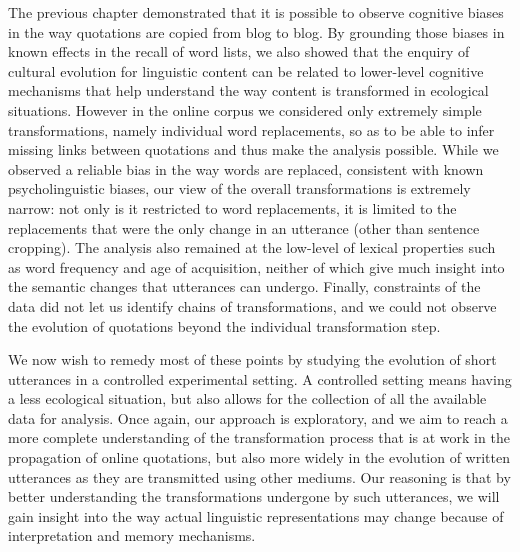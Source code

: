 \documentclass[a4paper,fleqn]{cas-dc}
\begin{document}
The previous chapter demonstrated that it is possible to observe
cognitive biases in the way quotations are copied from blog to blog. By
grounding those biases in known effects in the recall of word lists, we
also showed that the enquiry of cultural evolution for linguistic
content can be related to lower-level cognitive mechanisms that help
understand the way content is transformed in ecological situations.
However in the online corpus we considered only extremely simple
transformations, namely individual word replacements, so as to be able
to infer missing links between quotations and thus make the analysis
possible. While we observed a reliable bias in the way words are
replaced, consistent with known psycholinguistic biases, our view of the
overall transformations is extremely narrow: not only is it restricted
to word replacements, it is limited to the replacements that were the
only change in an utterance (other than sentence cropping). The analysis
also remained at the low-level of lexical properties such as word
frequency and age of acquisition, neither of which give much insight
into the semantic changes that utterances can undergo. Finally,
constraints of the data did not let us identify chains of
transformations, and we could not observe the evolution of quotations
beyond the individual transformation step.

We now wish to remedy most of these points by studying the evolution of
short utterances in a controlled experimental setting. A controlled
setting means having a less ecological situation, but also allows for
the collection of all the available data for analysis. Once again, our
approach is exploratory, and we aim to reach a more complete
understanding of the transformation process that is at work in the
propagation of online quotations, but also more widely in the evolution
of written utterances as they are transmitted using other mediums. Our
reasoning is that by better understanding the transformations undergone
by such utterances, we will gain insight into the way actual linguistic
representations may change because of interpretation and memory
mechanisms.
\end{document}
